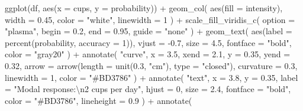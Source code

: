 \documentclass[
  letterpaper,
  DIV=11,
  numbers=noendperiod]{scrreprt}
\newenvironment{Shaded}{\begin{snugshade}}{\end{snugshade}}
\newcommand{\AttributeTok}[1]{\textcolor[rgb]{0.40,0.45,0.13}{#1}}
\newcommand{\DecValTok}[1]{\textcolor[rgb]{0.68,0.00,0.00}{#1}}
\newcommand{\FloatTok}[1]{\textcolor[rgb]{0.68,0.00,0.00}{#1}}
\newcommand{\FunctionTok}[1]{\textcolor[rgb]{0.28,0.35,0.67}{#1}}
\newcommand{\NormalTok}[1]{\textcolor[rgb]{0.00,0.23,0.31}{#1}}
\newcommand{\SpecialCharTok}[1]{\textcolor[rgb]{0.37,0.37,0.37}{#1}}
\newcommand{\StringTok}[1]{\textcolor[rgb]{0.13,0.47,0.30}{#1}}
\begin{document}
\begin{Shaded}
\begin{Highlighting}[]
\FunctionTok{ggplot}\NormalTok{(df, }\FunctionTok{aes}\NormalTok{(}\AttributeTok{x =}\NormalTok{ cups, }\AttributeTok{y =}\NormalTok{ probability)) }\SpecialCharTok{+}
  \FunctionTok{geom\_col}\NormalTok{(}
    \FunctionTok{aes}\NormalTok{(}\AttributeTok{fill =}\NormalTok{ intensity),}
    \AttributeTok{width =} \FloatTok{0.45}\NormalTok{,}
    \AttributeTok{color =} \StringTok{"white"}\NormalTok{,}
    \AttributeTok{linewidth =} \DecValTok{1}
\NormalTok{  ) }\SpecialCharTok{+}
  \FunctionTok{scale\_fill\_viridis\_c}\NormalTok{(}
    \AttributeTok{option =} \StringTok{"plasma"}\NormalTok{,}
    \AttributeTok{begin =} \FloatTok{0.2}\NormalTok{,}
    \AttributeTok{end =} \FloatTok{0.95}\NormalTok{,}
    \AttributeTok{guide =} \StringTok{"none"}
\NormalTok{  ) }\SpecialCharTok{+}
  \FunctionTok{geom\_text}\NormalTok{(}
    \FunctionTok{aes}\NormalTok{(}\AttributeTok{label =} \FunctionTok{percent}\NormalTok{(probability, }\AttributeTok{accuracy =} \DecValTok{1}\NormalTok{)),}
    \AttributeTok{vjust =} \SpecialCharTok{{-}}\FloatTok{0.7}\NormalTok{,}
    \AttributeTok{size =} \FloatTok{4.5}\NormalTok{,}
    \AttributeTok{fontface =} \StringTok{"bold"}\NormalTok{,}
    \AttributeTok{color =} \StringTok{"gray20"}
\NormalTok{  ) }\SpecialCharTok{+}
  \FunctionTok{annotate}\NormalTok{(}
    \StringTok{"curve"}\NormalTok{,}
    \AttributeTok{x =} \FloatTok{3.5}\NormalTok{, }\AttributeTok{xend =} \FloatTok{2.1}\NormalTok{,}
    \AttributeTok{y =} \FloatTok{0.35}\NormalTok{, }\AttributeTok{yend =} \FloatTok{0.32}\NormalTok{,}
    \AttributeTok{arrow =} \FunctionTok{arrow}\NormalTok{(}\AttributeTok{length =} \FunctionTok{unit}\NormalTok{(}\FloatTok{0.3}\NormalTok{, }\StringTok{"cm"}\NormalTok{), }\AttributeTok{type =} \StringTok{"closed"}\NormalTok{),}
    \AttributeTok{curvature =} \FloatTok{0.3}\NormalTok{,}
    \AttributeTok{linewidth =} \DecValTok{1}\NormalTok{,}
    \AttributeTok{color =} \StringTok{"\#BD3786"}
\NormalTok{  ) }\SpecialCharTok{+}
  \FunctionTok{annotate}\NormalTok{(}
    \StringTok{"text"}\NormalTok{,}
    \AttributeTok{x =} \FloatTok{3.8}\NormalTok{, }\AttributeTok{y =} \FloatTok{0.35}\NormalTok{,}
    \AttributeTok{label =} \StringTok{"Modal response:}\SpecialCharTok{\textbackslash{}n}\StringTok{2 cups per day"}\NormalTok{,}
    \AttributeTok{hjust =} \DecValTok{0}\NormalTok{,}
    \AttributeTok{size =} \FloatTok{2.4}\NormalTok{,}
    \AttributeTok{fontface =} \StringTok{"bold"}\NormalTok{,}
    \AttributeTok{color =} \StringTok{"\#BD3786"}\NormalTok{,}
    \AttributeTok{lineheight =} \FloatTok{0.9}
\NormalTok{  ) }\SpecialCharTok{+}
  \FunctionTok{annotate}\NormalTok{(}

\end{Highlighting}
\end{Shaded}
\end{document}
